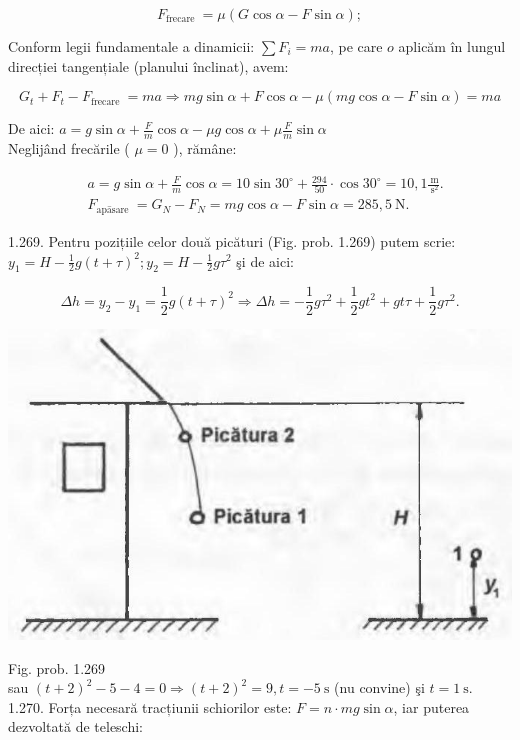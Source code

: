 \documentclass[10pt]{article}
\begin{document}
$$
F_{\text {frecare }}=\mu(G \cos \alpha-F \sin \alpha) ;
$$

Conform legii fundamentale a dinamicii: $\sum F_{i}=m a$, pe care $o$ aplicăm în lungul direcției tangențiale (planului înclinat), avem:

$$
G_{t}+F_{t}-F_{\text {frecare }}=m a \Rightarrow m g \sin \alpha+F \cos \alpha-\mu(m g \cos \alpha-F \sin \alpha)=m a
$$

De aici: $a=g \sin \alpha+\frac{F}{m} \cos \alpha-\mu g \cos \alpha+\mu \frac{F}{m} \sin \alpha$\\
Neglijând frecările ( $\mu=0$ ), rămâne:

$$
\begin{aligned}
& a=g \sin \alpha+\frac{F}{m} \cos \alpha=10 \sin 30^{\circ}+\frac{294}{50} \cdot \cos 30^{\circ}=10,1 \frac{\mathrm{~m}}{\mathrm{~s}^{2}} . \\
& F_{\text {apāsare }}=G_{N}-F_{N}=m g \cos \alpha-F \sin \alpha=285,5 \mathrm{~N} .
\end{aligned}
$$

1.269. Pentru pozițiile celor două picături (Fig. prob. 1.269) putem scrie: $y_{1}=H-\frac{1}{2} g(t+\tau)^{2} ; y_{2}=H-\frac{1}{2} g \tau^{2}$ şi de aici:

$$
\Delta h=y_{2}-y_{1}=\frac{1}{2} g(t+\tau)^{2} \Rightarrow \Delta h=-\frac{1}{2} g \tau^{2}+\frac{1}{2} g t^{2}+g t \tau+\frac{1}{2} g \tau^{2} .
$$

\begin{center}
\includegraphics[max width=\textwidth]{2025_07_01_5b3ff9fa0d508c8e9f17g-257}
\end{center}

Fig. prob. 1.269\\
sau $(t+2)^{2}-5-4=0 \Rightarrow(t+2)^{2}=9, t=-5 \mathrm{~s}$ (nu convine) şi $t=1 \mathrm{~s}$.\\
1.270. Forța necesară tracțiunii schiorilor este: $F=n \cdot m g \sin \alpha$, iar puterea dezvoltată de teleschi:
\end{document}
